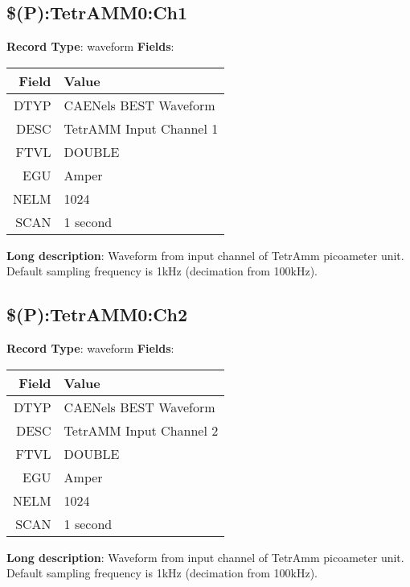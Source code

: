 \subsection{\$(P):TetrAMM0:Ch1}
\textbf{Record Type}: waveform \newline \newline 
\textbf{Fields}: \newline 
\begin{tabularx}{0.7\linewidth}{|r|X|}
\hline Field & Value \\
\hline
\hline
DTYP & CAENels BEST Waveform\\
\hline
DESC & TetrAMM Input Channel 1\\
\hline
FTVL & DOUBLE\\
\hline
EGU & Amper\\
\hline
NELM & 1024\\
\hline
SCAN & 1 second\\
\hline
\end{tabularx}
\newline \newline \newline
\textbf{Long description}: \newline 
 Waveform from input channel of TetrAmm picoameter unit. Default sampling frequency is 1kHz (decimation from 100kHz).
\newline \newline


\subsection{\$(P):TetrAMM0:Ch2}
\textbf{Record Type}: waveform \newline \newline 
\textbf{Fields}: \newline 
\begin{tabularx}{0.7\linewidth}{|r|X|}
\hline Field & Value \\
\hline
\hline
DTYP & CAENels BEST Waveform\\
\hline
DESC & TetrAMM Input Channel 2\\
\hline
FTVL & DOUBLE\\
\hline
EGU & Amper\\
\hline
NELM & 1024\\
\hline
SCAN & 1 second\\
\hline
\end{tabularx}
\newline \newline \newline
\textbf{Long description}: \newline 
 Waveform from input channel of TetrAmm picoameter unit. Default sampling frequency is 1kHz (decimation from 100kHz).
\newline \newline


